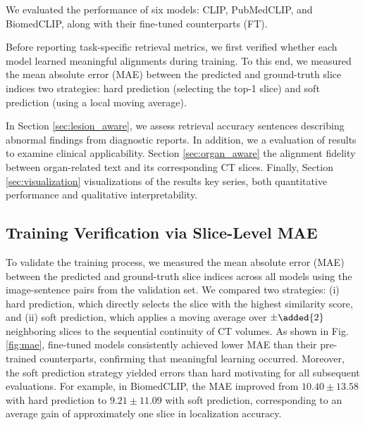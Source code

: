 \documentclass[bioengineering,article,submit,pdftex,moreauthors]{Definitions/mdpi}
\begin{document}
We evaluated the  performance of six models:  CLIP, PubMedCLIP, and BiomedCLIP, along with their fine-tuned counterparts (FT). 

  Before reporting task-specific retrieval metrics, we first verified whether each model learned meaningful alignments during training. To this end, we measured the mean absolute error (MAE) between the predicted and ground-truth slice indices  two strategies: hard prediction (selecting the top-1 slice) and soft prediction (using a local moving average).

In Section \ref{sec:lesion_aware}, we assess retrieval accuracy  sentences describing abnormal findings from diagnostic reports. 
In addition, we  a  evaluation of   results to examine clinical applicability.
Section \ref{sec:organ_aware}  the alignment fidelity between organ-related text and its corresponding CT slices. 
Finally, Section \ref{sec:visualization}  visualizations of the  results  key series,  both quantitative performance and qualitative interpretability.

\subsection{Training Verification via Slice-Level MAE}

  To validate the training process, we measured the mean absolute error (MAE) between the predicted and ground-truth slice indices across all models using the image-sentence pairs from the validation set. 
  We compared two strategies: (i) hard prediction, which directly selects the slice with the highest similarity score, and (ii) soft prediction, which applies a moving average over $\pm\added{ 2}$ neighboring slices to  the sequential continuity of CT volumes. 
  As shown in Fig. \ref{fig:mae}, fine-tuned models consistently achieved lower MAE than their pre-trained counterparts, confirming that meaningful learning occurred. 
  Moreover, the soft prediction strategy yielded  errors than hard  motivating   for all subsequent evaluations. For example, in BiomedCLIP, the MAE improved from $10.40 \pm 13.58$ with hard prediction to $9.21 \pm 11.09$ with soft prediction, corresponding to an average gain of approximately one slice in localization accuracy.
\end{document}
